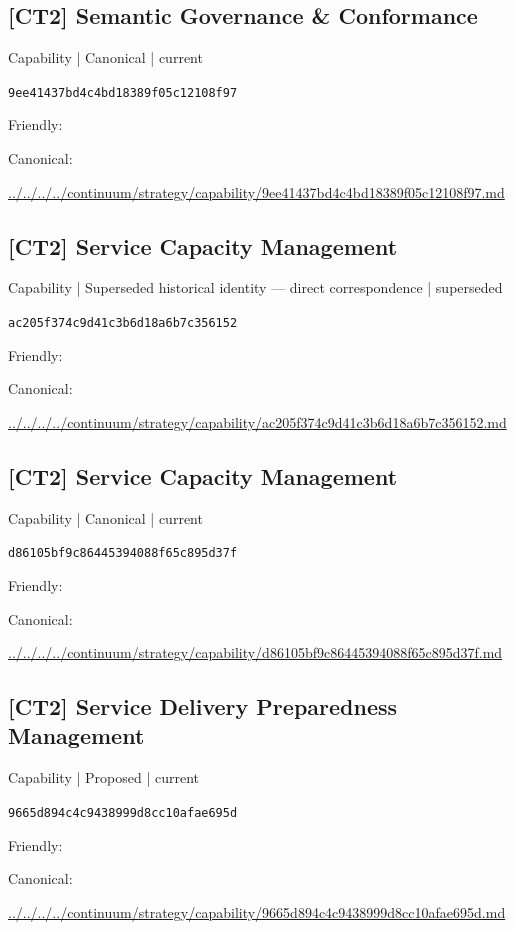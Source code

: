 \documentclass[10pt,a4paper]{article}
\begin{document}
\subsection*{[CT2] Semantic Governance \& Conformance}
{\small Capability | Canonical | current}\par
\texttt{9ee41437bd4c4bd18389f05c12108f97}\par
Friendly: \par
Canonical: \par
{\footnotesize\url{../../../../continuum/strategy/capability/9ee41437bd4c4bd18389f05c12108f97.md}}\par
\subsection*{[CT2] Service Capacity Management}
{\small Capability | Superseded historical identity — direct correspondence | superseded}\par
\texttt{ac205f374c9d41c3b6d18a6b7c356152}\par
Friendly: \par
Canonical: \par
{\footnotesize\url{../../../../continuum/strategy/capability/ac205f374c9d41c3b6d18a6b7c356152.md}}\par
\subsection*{[CT2] Service Capacity Management}
{\small Capability | Canonical | current}\par
\texttt{d86105bf9c86445394088f65c895d37f}\par
Friendly: \par
Canonical: \par
{\footnotesize\url{../../../../continuum/strategy/capability/d86105bf9c86445394088f65c895d37f.md}}\par
\subsection*{[CT2] Service Delivery Preparedness Management}
{\small Capability | Proposed | current}\par
\texttt{9665d894c4c9438999d8cc10afae695d}\par
Friendly: \par
Canonical: \par
{\footnotesize\url{../../../../continuum/strategy/capability/9665d894c4c9438999d8cc10afae695d.md}}\par
\end{document}
